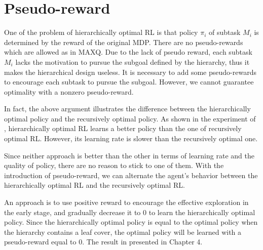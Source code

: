 \section{Pseudo-reward}
\label{se:pseudo}

One of the problem of hierarchically optimal RL is that policy $\pi_i$ of subtask $M_i$
is determined by the reward of the original MDP. There are no pseudo-rewards which are allowed as
in MAXQ. Due to the lack of pseudo reward, each subtask $M_i$ lacks the motivation to 
pursue the subgoal defined by the hierarchy, thus it makes the hierarchical 
design useless. It is necessary to add some pseudo-rewards to encourage each subtask to pursue 
the subgoal. However, we cannot guarantee optimality with a nonzero pseudo-reward.

In fact, the above argument illustrates the difference between the hierarchically optimal policy
and the recursively optimal policy. 
As shown in the experiment of \cite{Andre02}, hierarchically optimal RL learns  
a better policy than the one of recursively optimal RL. However, its learning rate
is slower than the recursively optimal one.

Since neither approach is better than the other in terms of learning rate and 
the quality of policy, there are no reason to stick to one of them.
With the introduction of pseudo-reward, we can alternate the agent's behavior
between the hierarchically optimal RL and the recursively optimal RL.

An approach is to use positive reward to encourage the effective exploration
in the early stage, and gradually decrease it to 0 to learn the hierarchically optimal policy. 
Since the hierarchically optimal policy is equal to the optimal policy when the hierarchy contains a leaf cover,
the optimal policy will be learned with a pseudo-reward equal to 0.
The result in presented in Chapter 4.


